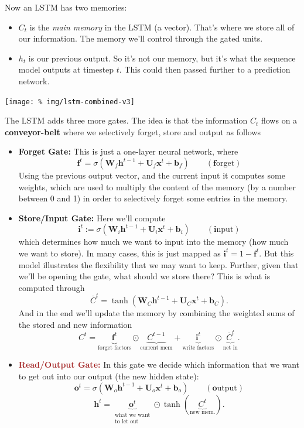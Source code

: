 \documentclass[a2paper,4pt]{extarticle}
\newcommand{\tcr}[1]{\textcolor{lighttext}{#1}}
\newcommand{\tcb}[1]{\textcolor{lighttext}{#1}}
\newcommand{\tcr}[1]{\textcolor{red}{#1}}
\newcommand{\tcb}[1]{\textcolor{blue}{#1}}
\newcommand{\mat}[1]{\mathbf{#1}}
\renewcommand{\vec}[1]{\mathbf{#1}}
\newcommand{\vb}{\vec{b}}
\newcommand{\vf}{\vec{f}}
\newcommand{\vh}{\vec{h}}
\newcommand{\vi}{\vec{i}}
\newcommand{\vo}{\vec{o}}
\newcommand{\vx}{\vec{x}}
\newcommand{\MU}{\mat{U}}
\newcommand{\MW}{\mat{W}}
\begin{document}
\begin{landscape}
\begin{multicols*}{7}
Now an LSTM has two memories:
\begin{itemize}
  \item $C_t$ is the \emph{main memory} in the LSTM (a vector). That's where we
  store all of our information. The memory we'll control through the gated
  units.
  \item $h_t$ is our previous output. So it's not our memory, but it's what the
  sequence model outputs at timestep $t$. This could then passed further to a
  prediction network.
\end{itemize}

\begin{center}
  \texttt{[image: \%
img/lstm-combined-v3]}
\end{center}

The LSTM adds three more gates. The idea is that the information $C_t$ flows on
a \textbf{\tcb{conveyor-belt}} where we selectively forget, store and output as
follows

\begin{itemize}
  \item \textbf{\textcolor{RubineRed}{Forget Gate:}} This is just a one-layer
  neural network, where
  \[
  \vf^t=\sigma(\MW_f\vh^{t-1}+\MU_f\vx^t+\vb_f)
  \qquad(\vf\text{orget})
  \]
  Using the previous output vector, and the current input it computes some
  weights, which are used to multiply the content of the memory (by a number
  between 0 and 1) in order to selectively forget some entries in the memory.
  \item \textbf{\tcr{Store/Input Gate:}} Here we'll compute
  \[
  \vi^t:=\sigma(\MW_i\vh^{t-1}+\MU_i\vx^t+\vb_i)
  \qquad(\vi\text{nput})
  \]
  which determines how much we want to input into the memory (how much we want
  to store). 
  In many cases, this is just mapped as $\vi^t=1-\vf^t$. But this
  model illustrates the flexibility that we may want to keep. Further, given
  that we'll be opening the gate, what should we store there? This is what is
  computed through
  \[
  \overline{C}^t=\tanh(\MW_C\vh^{t-1}+\MU_C\vx^t+\vb_C).
  \]
  And in the end we'll update the memory by combining the weighted sums of
  the stored and new information
  \[
  C^t=\underbrace{\vf^t}_{\text{forget factors}} \odot
  \underbrace{C^{t-1}}_{\text{current mem}} + \underbrace{\vi^t}_{\text{write
  factors}} \odot\underbrace{\overline{C}^t}_{\text{net in}}.
  \]
  \item \textbf{\textcolor{brown}{Read/Output Gate:}} In this gate we decide
  which information that we want to get out into our output (the new hidden
  state):
  \[
  \vo^t=\sigma(\MW_o\vh^{t-1}+\MU_o\vx^t+\vb_o)
  \qquad(\vo\text{utput})
  \]
  \[
  \vh^t=\underbrace{\vo^t}_{\substack{\text{what we want}\\\text{to let
out}}}\odot\tanh(\underbrace{C^t}_{\text{new mem.}}).
  \]
\end{itemize}


\end{multicols*}
\end{landscape}
\end{document}
